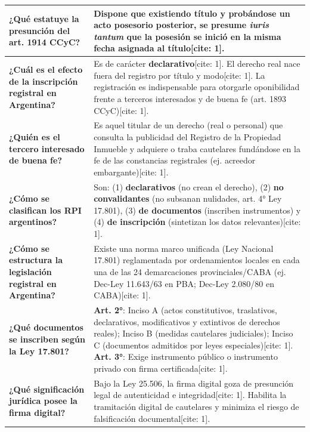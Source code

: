 \documentclass[12pt,oneside]{book}
\begin{document}
\begin{longtable}{|p{4.5cm}|p{10.5cm}|}
\textbf{¿Qué estatuye la presunción del art. 1914 CCyC?} &
Dispone que existiendo título y probándose un acto posesorio posterior, se presume \textit{iuris tantum} que la posesión se inició en la misma fecha asignada al título[cite: 1]. \\ \hline

\textbf{¿Cuál es el efecto de la inscripción registral en Argentina?} &
Es de carácter \textbf{declarativo}[cite: 1]. El derecho real nace fuera del registro por título y modo[cite: 1]. La registración es indispensable para otorgarle oponibilidad frente a terceros interesados y de buena fe (art. 1893 CCyC)[cite: 1]. \\ \hline

\textbf{¿Quién es el tercero interesado de buena fe?} &
Es aquel titular de un derecho (real o personal) que consulta la publicidad del Registro de la Propiedad Inmueble y adquiere o traba cautelares fundándose en la fe de las constancias registrales (ej. acreedor embargante)[cite: 1]. \\ \hline

\textbf{¿Cómo se clasifican los RPI argentinos?} &
Son: (1) \textbf{declarativos} (no crean el derecho), (2) \textbf{no convalidantes} (no subsanan nulidades, art. 4° Ley 17.801), (3) \textbf{de documentos} (inscriben instrumentos) y (4) \textbf{de inscripción} (sintetizan los datos relevantes)[cite: 1]. \\ \hline

\textbf{¿Cómo se estructura la legislación registral en Argentina?} &
Existe una norma marco unificada (Ley Nacional 17.801) reglamentada por ordenamientos locales en cada una de las 24 demarcaciones provinciales/CABA (ej. Dec-Ley 11.643/63 en PBA; Dec-Ley 2.080/80 en CABA)[cite: 1]. \\ \hline

\textbf{¿Qué documentos se inscriben según la Ley 17.801?} &
\textbf{Art. 2°}: Inciso A (actos constitutivos, traslativos, declarativos, modificativos y extintivos de derechos reales); Inciso B (medidas cautelares judiciales); Inciso C (documentos admitidos por leyes especiales)[cite: 1]. \textbf{Art. 3°}: Exige instrumento público o instrumento privado con firma certificada[cite: 1]. \\ \hline

\textbf{¿Qué significación jurídica posee la firma digital?} &
Bajo la Ley 25.506, la firma digital goza de presunción legal de autenticidad e integridad[cite: 1]. Habilita la tramitación digital de cautelares y minimiza el riesgo de falsificación documental[cite: 1]. \\ \hline


\end{longtable}
\end{document}
